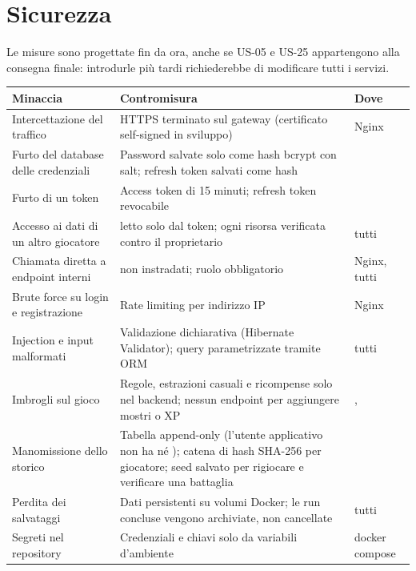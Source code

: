 \documentclass[11pt,a4paper]{article}
\begin{document}
\section{Sicurezza}\label{sec:sicurezza}

Le misure sono progettate fin da ora, anche se US-05 e US-25 appartengono alla consegna finale: introdurle più tardi richiederebbe di modificare tutti i servizi.

\begin{xltabular}{\linewidth}{@{}L{4.3cm}YL{2.6cm}@{}}
  \toprule
  Minaccia & Contromisura & Dove \\
  \midrule
  \endhead
  Intercettazione del traffico & HTTPS terminato sul gateway (certificato self-signed in sviluppo) & Nginx \\
  Furto del database delle credenziali & Password salvate solo come hash bcrypt con salt; refresh token salvati come hash &  \\
  Furto di un token & Access token di 15 minuti; refresh token revocabile &  \\
  Accesso ai dati di un altro giocatore &  letto solo dal token; ogni risorsa verificata contro il proprietario & tutti \\
  Chiamata diretta a endpoint interni &  non instradati; ruolo  obbligatorio & Nginx, tutti \\
  Brute force su login e registrazione & Rate limiting per indirizzo IP & Nginx \\
  Injection e input malformati & Validazione dichiarativa (Hibernate Validator); query parametrizzate tramite ORM & tutti \\
  Imbrogli sul gioco & Regole, estrazioni casuali e ricompense solo nel backend; nessun endpoint per aggiungere mostri o XP & ,  \\
  Manomissione dello storico & Tabella append-only (l'utente applicativo non ha  né ); catena di hash SHA-256 per giocatore; seed salvato per rigiocare e verificare una battaglia &  \\
  Perdita dei salvataggi & Dati persistenti su volumi Docker; le run concluse vengono archiviate, non cancellate & tutti \\
  Segreti nel repository & Credenziali e chiavi solo da variabili d'ambiente & docker compose \\
  \bottomrule
\end{xltabular}
\end{document}
